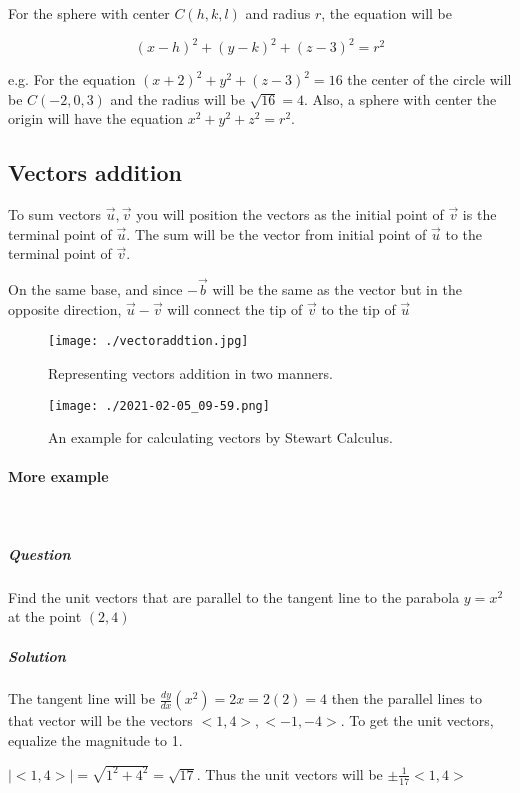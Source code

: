 \documentclass{article}
\begin{document}
	For the sphere with center $C(h,k,l)$ and radius $r$, the equation will be

	\begin{equation}
		(x-h)^2 + (y-k)^2 +(z-3)^2 = r^2
	\end{equation}

	e.g. For the equation $(x+2)^2 + y^2 + (z-3)^2 = 16$ the center of the circle will be $C(-2,0,3)$ and the radius will be $ \sqrt{16} = 4$. Also, a sphere with center the origin will have the equation $x^2+y^2+z^2=r^2$.

	\subsection{Vectors addition}

	To sum vectors $\vec{u}, \vec{v}$ you will position the vectors as the initial point of $\vec{v}$ is the terminal point of $\vec{u}$. The sum will be the vector from initial point of $\vec{u}$ to the terminal point of $\vec{v}$.

	On the same base, and since $-\vec{b}$ will be the same as the vector but in the opposite direction, $\vec{u} - \vec{v}$ will connect the tip of $\vec{v}$ to the tip of $\vec{u}$

	\begin{figure}[h!]
		\texttt{[image: ./vectoraddtion.jpg]}
		\caption{Representing vectors addition in two manners.}
	\end{figure}

	\begin{figure}[h!]
		\texttt{[image: ./2021-02-05\_09-59.png]}
		\caption{An example for calculating vectors by Stewart Calculus.}
	\end{figure}	

	\paragraph{More example} \

	\subparagraph{Question}
	Find the unit vectors that are parallel to the tangent line to the parabola $y=x^2$ at the point $(2,4)$

	\subparagraph{Solution}
	The tangent line will be $ \frac{dy}{dx}(x^2) = 2x = 2(2) = 4$ then the parallel lines to that vector will be the vectors $<1,4>,<-1,-4>$. To get the unit vectors, equalize the magnitude to 1. 

	$|<1,4>| = \sqrt{1^2 + 4^2} = \sqrt{17}$. Thus the unit vectors will be $\pm\frac{1}{17}<1,4>$
\end{document}
